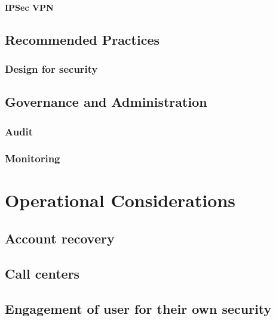 \hypertarget{ipsec-vpn}{%
\subsubsection{IPSec VPN}\label{ipsec-vpn}}

\hypertarget{recommended-practices}{%
\section{Recommended Practices}\label{recommended-practices}}

\hypertarget{design-for-security}{%
\subsection{Design for security}\label{design-for-security}}

\hypertarget{governance-and-administration}{%
\section{Governance and
Administration}\label{governance-and-administration}}

\hypertarget{audit}{%
\subsection{Audit}\label{audit}}

\hypertarget{monitoring}{%
\subsection{Monitoring}\label{monitoring}}

\hypertarget{operational-considerations}{%
\chapter{Operational Considerations}\label{operational-considerations}}

\hypertarget{account-recovery}{%
\section{Account recovery}\label{account-recovery}}

\hypertarget{call-centers}{%
\section{Call centers}\label{call-centers}}

\hypertarget{engagement-of-user-for-their-own-security}{%
\section{Engagement of user for their own
security}\label{engagement-of-user-for-their-own-security}}

